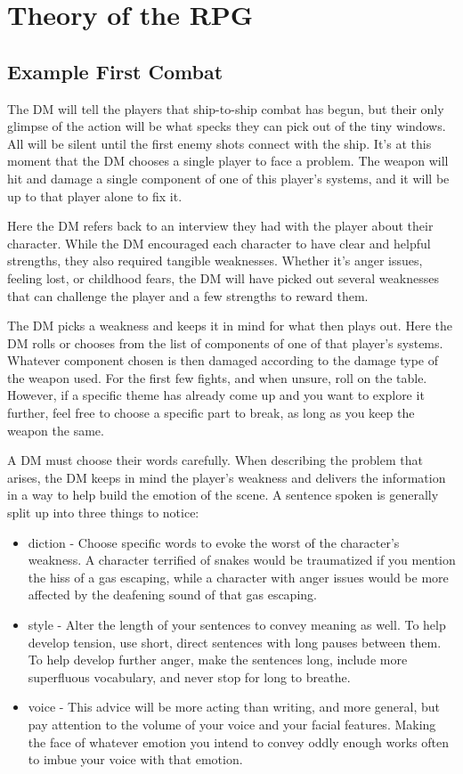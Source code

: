 \documentclass[a4paper]{article}
\begin{document}
\section{Theory of the RPG} \label{theory}

\subsection{Example First Combat}

The DM will tell the players that ship-to-ship combat has begun, but their only glimpse of the action will be what specks they can pick out of the tiny windows. All will be silent until the first enemy shots connect with the ship. It's at this moment that the DM chooses a single player to face a problem. The weapon will hit and damage a single component of one of this player's systems, and it will be up to that player alone to fix it.

Here the DM refers back to an interview they had with the player about their character. While the DM encouraged each character to have clear and helpful strengths, they also required tangible weaknesses. Whether it's anger issues, feeling lost, or childhood fears, the DM will have picked out several weaknesses that can challenge the player and a few strengths to reward them.

The DM picks a weakness and keeps it in mind for what then plays out. Here the DM rolls or chooses from the list of components of one of that player's systems. Whatever component chosen is then damaged according to the damage type of the weapon used. For the first few fights, and when unsure, roll on the table. However, if a specific theme has already come up and you want to explore it further, feel free to choose a specific part to break, as long as you keep the weapon the same.

A DM must choose their words carefully. When describing the problem that arises, the DM keeps in mind the player's weakness and delivers the information in a way to help build the emotion of the scene. A sentence spoken is generally split up into three things to notice:
\begin{itemize}
\item diction - Choose specific words to evoke the worst of the character's weakness. A character terrified of snakes would be traumatized if you mention the hiss of a gas escaping, while a character with anger issues would be more affected by the deafening sound of that gas escaping.
\item style - Alter the length of your sentences to convey meaning as well. To help develop tension, use short, direct sentences with long pauses between them. To help develop further anger, make the sentences long, include more superfluous vocabulary, and never stop for long to breathe.
\item voice - This advice will be more acting than writing, and more general, but pay attention to the volume of your voice and your facial features. Making the face of whatever emotion you intend to convey oddly enough works often to imbue your voice with that emotion.
\end{itemize}
\end{document}
